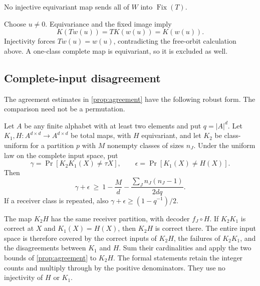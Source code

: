 \begin{corollary}
\label{cor:scattered-one-class}
No injective equivariant map sends all of $W$ into
$\operatorname{Fix}(T)$.
\end{corollary}
\begin{outline}
Choose $u\ne0$. Equivariance and the fixed image imply
\[K(Tw(u))=TK(w(u))=K(w(u)).\]  Injectivity forces $Tw(u)=w(u)$,
contradicting the free-orbit calculation above.  A one-class complete
map is equivariant, so it is excluded as well.
\end{outline}

\subsection{Complete-input disagreement}

The agreement estimates in \cref{prop:agreement} have the following
robust form.  The comparison need not be a permutation.

\begin{proposition}
\label{prop:robust-equivariant-comparison}
Let $A$ be any finite alphabet with at least two elements and put
$q=|A|^d$.  Let $K_1,H\colon A^{d\times d}\to A^{d\times d}$ be
total maps, with $H$ equivariant, and let $K_2$ be class-uniform for a
partition $p$ with $M$ nonempty classes of sizes $n_J$.  Under the
uniform law on the complete input space, put
\[
 \gamma=\Pr[K_2K_1(X)\ne\tau X],\qquad
 \epsilon=\Pr[K_1(X)\ne H(X)].
\]
Then
\[
 \gamma+\epsilon\ \ge\
 1-\frac Md-\frac{\sum_Jn_J(n_J-1)}{2dq}.
\]
If a receiver class is repeated, also
$\gamma+\epsilon\ge(1-q^{-1})/2$.
\end{proposition}
\begin{outline}
The map $K_2H$ has the same receiver partition, with decoder
$f_J\circ H$.  If $K_2K_1$ is correct at $X$ and $K_1(X)=H(X)$,
then $K_2H$ is correct there.  The entire input space is therefore
covered by the correct inputs of $K_2H$, the failures of $K_2K_1$,
and the disagreements between $K_1$ and $H$.  Sum their cardinalities
and apply the two bounds of \cref{prop:agreement} to $K_2H$.
The formal statements retain the integer counts and multiply through
by the positive denominators.  They use no injectivity of $H$ or $K_1$.
\end{outline}

